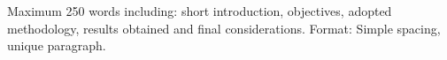 Maximum 250 words including: short introduction, objectives, adopted methodology, results obtained and final considerations. Format: Simple spacing, unique paragraph.
